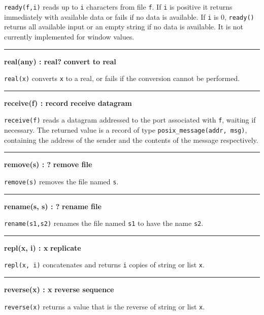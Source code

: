 \noindent
{}\texttt{ready(f,i)} reads up to \texttt{i} characters
from file \texttt{f}. If \texttt{i} is positive it returns immediately with available data or
fails if no data is available. If \texttt{i} is 0, \texttt{ready()}
returns all available input or an empty string if no data is available.
It is not currently implemented for window values.

\bigskip\hrule\vspace{0.1cm}
\noindent
{\bf real(any) : real? } \hfill {\bf convert to real}

\noindent
{}\texttt{real(x)} converts \texttt{x} to a real,
or fails if the conversion cannot be performed.

\bigskip\hrule\vspace{0.1cm}
\noindent
{\bf receive(f) : record } \hfill {\bf receive datagram}

\noindent
{}\texttt{receive(f)} reads a datagram addressed
to the port associated with \texttt{f}, waiting if necessary. The
returned value is a record of type \texttt{posix\_message(addr, msg)},
containing the address of the sender and the contents of the message
respectively. 

\bigskip\hrule\vspace{0.1cm}
\noindent
{\bf remove(s) : ? } \hfill {\bf remove file}

\noindent
{}\texttt{remove(s)} removes the
file named \texttt{s}.

\bigskip\hrule\vspace{0.1cm}
\noindent
{\bf rename(s, s) : ? } \hfill {\bf rename file}

\noindent
{}\texttt{rename(s1,s2)} renames the file named
\texttt{s1} to have the name \texttt{s2}.

\bigskip\hrule\vspace{0.1cm}
\noindent
{\bf repl(x, i) : x } \hfill {\bf replicate}

\noindent
{}\texttt{repl(x, i)} concatenates and returns
\texttt{i} copies of string or list \texttt{x}.

\bigskip\hrule\vspace{0.1cm}
\noindent
{\bf reverse(x) : x } \hfill {\bf reverse sequence}

\noindent
{}\texttt{reverse(x)} returns a value that is the
reverse of string or list \texttt{x}.

